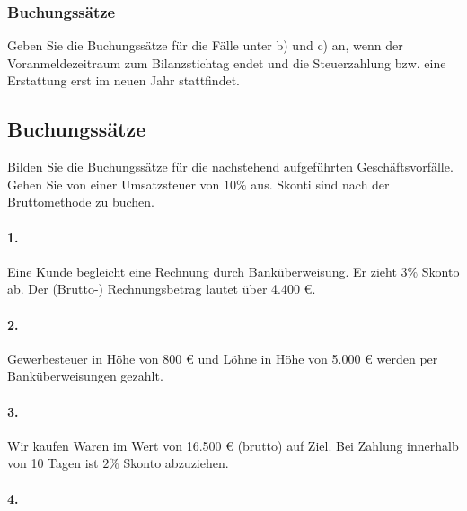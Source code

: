 \documentclass[paper=a4, fontsize=11pt]{scrartcl}
\numberwithin{equation}{section}
\numberwithin{figure}{section}
\numberwithin{table}{section}
\begin{document}
{%

\subsubsection{Buchungssätze}

Geben Sie die Buchungssätze für die Fälle unter b) und c) an, wenn der Voranmeldezeitraum zum Bilanzstichtag endet und die Steuerzahlung bzw. eine Erstattung erst im neuen Jahr stattfindet.


\subsection{Buchungssätze}

Bilden Sie die Buchungssätze für die nachstehend aufgeführten Geschäftsvorfälle. Gehen Sie von einer Umsatzsteuer von $10 \%$ aus. Skonti sind nach der Bruttomethode zu buchen. \\

\paragraph{1.}

Eine Kunde begleicht eine Rechnung durch Banküberweisung. Er zieht $3 \%$ Skonto ab. Der (Brutto-) Rechnungsbetrag lautet über 4.400 €. \\

\paragraph{2.}

Gewerbesteuer in Höhe von 800 € und Löhne in Höhe von 5.000 € werden per Banküberweisungen gezahlt. \\

\paragraph{3.}

Wir kaufen Waren im Wert von 16.500 € (brutto) auf Ziel. Bei Zahlung innerhalb von 10 Tagen ist $2 \%$ Skonto abzuziehen. \\

\paragraph{4.}

}
\end{document}
